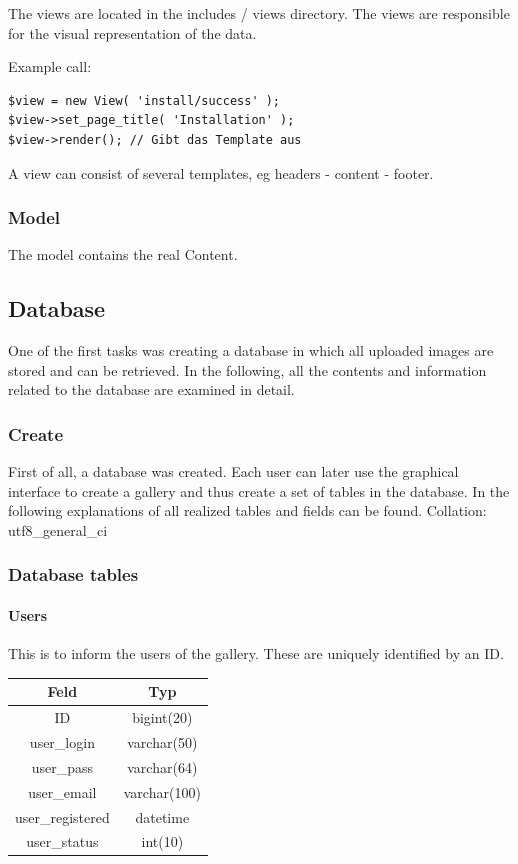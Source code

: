 \documentclass[a4paper,12pt,oneside]{article} %
\begin{document}
The views are located in the 
includes / views
directory. The views are responsible for the visual representation
of the data.

Example call:

\begin{lstlisting}
$view = new View( 'install/success' ); 
$view->set_page_title( 'Installation' );  
$view->render(); // Gibt das Template aus
\end{lstlisting}

A view can consist of several templates, eg headers - content - footer.


\subsubsection*{Model}
The model contains the real Content.

\subsection{Database}

One of the first tasks was creating a database in which all uploaded
images are stored and can be retrieved. In the following, all the
contents and information related to the database are examined in detail.


\subsubsection{Create}

First of all, a database was created. Each user can later use the graphical
interface to create a gallery and thus create a set of tables in the
database. In the following explanations of all realized tables and fields
can be found. Collation: utf8\_general\_ci


\subsubsection{Database tables}


\paragraph*{Users}

This is to inform the users of the gallery. These are uniquely identified
by an ID.
\begin{tabular}{|c|c|}
\hline 
Feld & Typ\tabularnewline
\hline 
\hline 
ID & bigint(20)\tabularnewline
\hline 
user\_login & varchar(50)\tabularnewline
\hline 
user\_pass & varchar(64)\tabularnewline
\hline 
user\_email & varchar(100)\tabularnewline
\hline 
user\_registered & datetime\tabularnewline
\hline 
user\_status & int(10)\tabularnewline
\hline 
\end{tabular}
\end{document}
